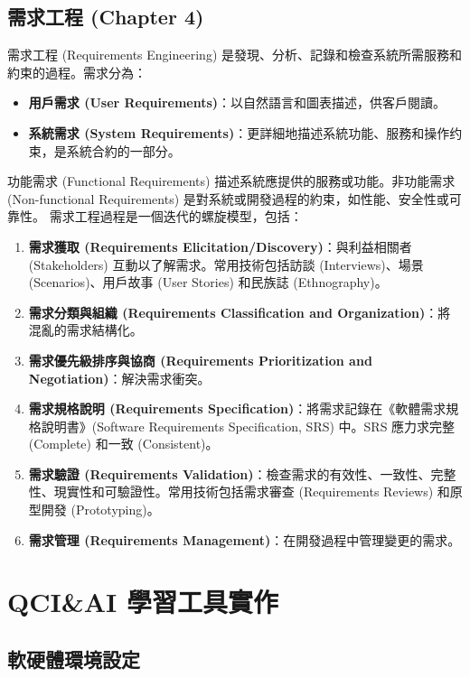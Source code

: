 \documentclass[twocolumn,11pt,a4paper]{article}
\begin{document}
\subsection{需求工程 (Chapter 4)}
需求工程 (Requirements Engineering) 是發現、分析、記錄和檢查系統所需服務和約束的過程。需求分為：
\begin{itemize}[noitemsep, topsep=0pt]
    \item \textbf{用戶需求 (User Requirements)}：以自然語言和圖表描述，供客戶閱讀。
    \item \textbf{系統需求 (System Requirements)}：更詳細地描述系統功能、服務和操作约束，是系統合約的一部分。
\end{itemize}
功能需求 (Functional Requirements) 描述系統應提供的服務或功能。非功能需求 (Non-functional Requirements) 是對系統或開發過程的約束，如性能、安全性或可靠性。
需求工程過程是一個迭代的螺旋模型，包括：
\begin{enumerate}[noitemsep, topsep=0pt]
    \item \textbf{需求獲取 (Requirements Elicitation/Discovery)}：與利益相關者 (Stakeholders) 互動以了解需求。常用技術包括訪談 (Interviews)、場景 (Scenarios)、用戶故事 (User Stories) 和民族誌 (Ethnography)。
    \item \textbf{需求分類與組織 (Requirements Classification and Organization)}：將混亂的需求結構化。
    \item \textbf{需求優先級排序與協商 (Requirements Prioritization and Negotiation)}：解決需求衝突。
    \item \textbf{需求規格說明 (Requirements Specification)}：將需求記錄在《軟體需求規格說明書》(Software Requirements Specification, SRS) 中。SRS 應力求完整 (Complete) 和一致 (Consistent)。
    \item \textbf{需求驗證 (Requirements Validation)}：檢查需求的有效性、一致性、完整性、現實性和可驗證性。常用技術包括需求審查 (Requirements Reviews) 和原型開發 (Prototyping)。
    \item \textbf{需求管理 (Requirements Management)}：在開發過程中管理變更的需求。
\end{enumerate}

\section{QCI\&AI 學習工具實作}

\subsection{軟硬體環境設定}
\end{document}
